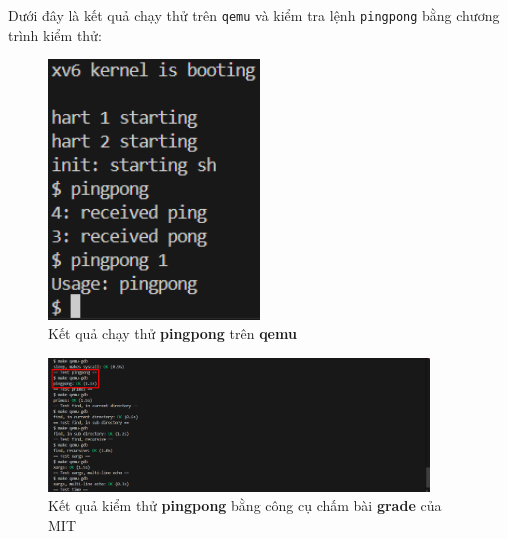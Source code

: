 Dưới đây là kết quả chạy thử trên \verb|qemu| và kiểm tra lệnh \verb|pingpong| bằng chương trình kiểm thử:
\begin{figure}[htp!]
	\centering
	\includegraphics[width=0.5\textwidth]{figures/exec-pingpong}
	\caption{Kết quả chạy thử \textbf{pingpong} trên \textbf{qemu}}
\end{figure}
\begin{figure}[htp!]
	\centering
	\includegraphics[width=0.9\textwidth]{figures/pingpong-test}
	\caption{Kết quả kiểm thử \textbf{pingpong} bằng công cụ chấm bài \textbf{grade} của MIT}
\end{figure}